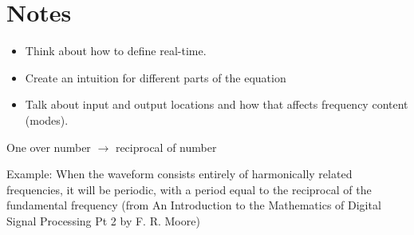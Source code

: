 \section*{Notes}\label{sec:ch2label}
\begin{itemize}
  \item Think about how to define real-time.
  \item Create an intuition for different parts of the equation
  \item Talk about input and output locations and how that affects frequency content (modes).
\end{itemize}
One over number $\rightarrow$ reciprocal of number

Example: When the waveform consists
entirely of harmonically related frequencies, it will be periodic, with a period equal to the reciprocal of the fundamental frequency (from An Introduction to the Mathematics of Digital Signal Processing Pt 2 by F. R. Moore)

